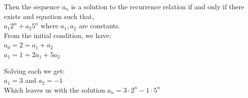 \documentclass[fontsize=11pt]{scrartcl} %
\begin{document}
Then the sequence $a_n$ is a solution to the recurrence relation if and only if there exists and equation such that,\\
$a_1 2^n + a_2 5^n$ where $a_1, a_2$ are constants.\\

From the initial condition, we have:\\
$a_0 = 2 = a_1 + a_2$\\
$a_1 = 1 = 2a_1 + 5a_2$

Solving each we get:\\
$a_1 = 3$ and $a_2 = -1$\\

Which leaves us with the solution $a_n = 3\cdot2^n -1\cdot5^n$
\end{document}
